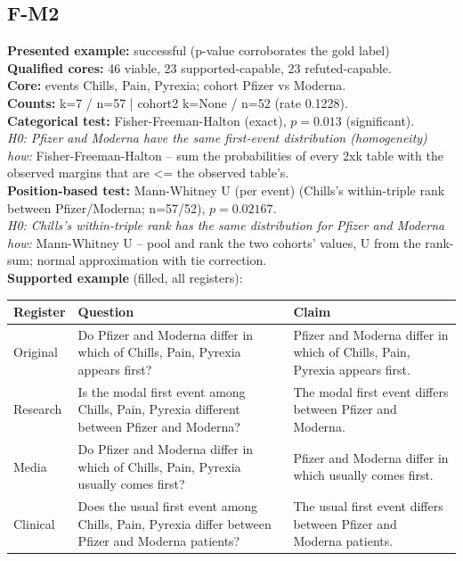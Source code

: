 \documentclass[11pt]{article}
\begin{document}
\subsection*{F-M2}
\textbf{Presented example:} successful (p-value corroborates the gold label) \\
\textbf{Qualified cores:} 46 viable, 23 supported-capable, 23 refuted-capable. \\
\textbf{Core:} events Chills, Pain, Pyrexia; cohort Pfizer vs Moderna. \\
\textbf{Counts:} k=7 / n=57  |  cohort2 k=None / n=52  (rate 0.1228). \\
\textbf{Categorical test:} Fisher-Freeman-Halton (exact), $p = 0.013$ (significant). \\
\emph{H0: Pfizer and Moderna have the same first-event distribution (homogeneity)} \\
\emph{how:} Fisher-Freeman-Halton -- sum the probabilities of every 2xk table with the observed margins that are <= the observed table's. \\
\textbf{Position-based test:} Mann-Whitney U (per event) (Chills's within-triple rank between Pfizer/Moderna; n=57/52), $p = 0.02167$. \\
\emph{H0: Chills's within-triple rank has the same distribution for Pfizer and Moderna} \\
\emph{how:} Mann-Whitney U -- pool and rank the two cohorts' values, U from the rank-sum; normal approximation with tie correction. \\
\textbf{Supported example} (filled, all registers): \\
\begin{tabularx}{\linewidth}{@{}l L L@{}}
\toprule
\textbf{Register} & \textbf{Question} & \textbf{Claim} \\
\midrule
Original & Do Pfizer and Moderna differ in which of Chills, Pain, Pyrexia appears first? & Pfizer and Moderna differ in which of Chills, Pain, Pyrexia appears first. \\
Research & Is the modal first event among Chills, Pain, Pyrexia different between Pfizer and Moderna? & The modal first event differs between Pfizer and Moderna. \\
Media & Do Pfizer and Moderna differ in which of Chills, Pain, Pyrexia usually comes first? & Pfizer and Moderna differ in which usually comes first. \\
Clinical & Does the usual first event among Chills, Pain, Pyrexia differ between Pfizer and Moderna patients? & The usual first event differs between Pfizer and Moderna patients. \\
\bottomrule
\end{tabularx}
\vspace{3pt}
\end{document}
